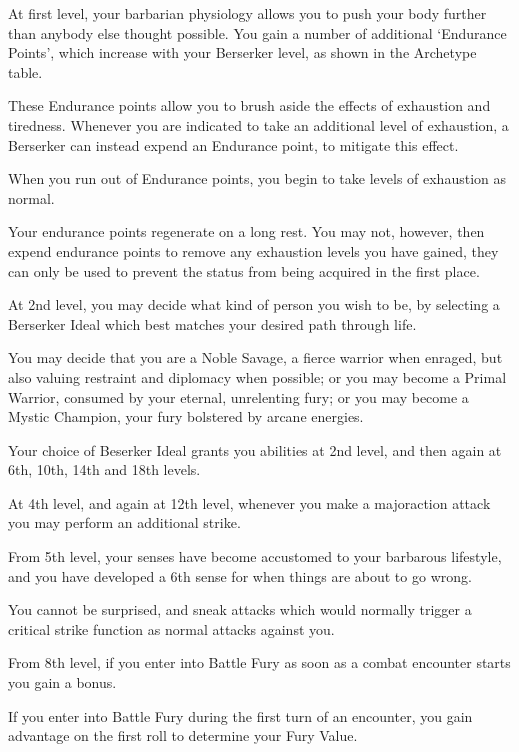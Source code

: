 {
At first level, your barbarian physiology allows you to push your body further than anybody else thought possible. You gain a number of additional `Endurance Points', which increase with your Berserker level, as shown in the Archetype table. 

These Endurance points allow you to brush aside the effects of exhaustion and tiredness. Whenever you are indicated to take an additional level of exhaustion, a Berserker can instead expend an Endurance point, to mitigate this effect. 

When you run out of Endurance points, you begin to take levels of exhaustion as normal. 

Your endurance points regenerate on a long rest. You may not, however, then expend endurance points to remove any exhaustion levels you have gained, they can only be used to prevent the status from being acquired in the first place.
}

{

	At 2nd level, you may decide what kind of person you wish to be, by selecting a Berserker Ideal which best matches your desired path through life. 
	
	You may decide that you are a Noble Savage, a fierce warrior when enraged, but also valuing restraint and diplomacy when possible; or you may become a Primal Warrior, consumed by your eternal, unrelenting fury; or you may become a Mystic Champion, your fury bolstered by arcane energies. 
	
	Your choice of Beserker Ideal grants you abilities at 2nd level, and then again at 6th, 10th, 14th and 18th levels. 
}

{
	At 4th level, and again at 12th level, whenever you make a major\minus{}action attack you may perform an additional strike. 
}

{
	From 5th level, your senses have become accustomed to your barbarous lifestyle, and you have developed a 6th sense for when things are about to go wrong. 

	You cannot be surprised, and sneak attacks which would normally trigger a critical strike function as normal attacks against you. 
}

{
	From 8th level, if you enter into Battle Fury as soon as a combat encounter starts you gain a bonus. 
	
	If you enter into Battle Fury during the first turn of an encounter, you gain advantage on the first roll to determine your Fury Value.  
}


